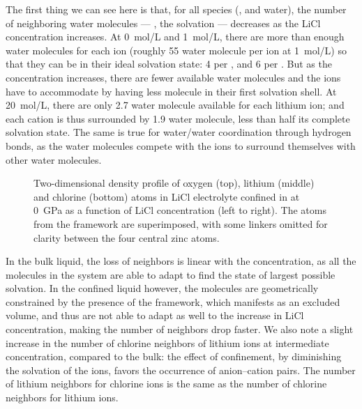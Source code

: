 \documentclass[thesis]{subfiles}
\begin{document}
The first thing we can see here is that, for all species (,  and
water), the number of neighboring water molecules --- \ie, the solvation ---
decreases as the LiCl concentration increases. At \SI{0}{mol/L} and
\SI{1}{mol/L}, there are more than enough water molecules for each ion (roughly
55 water molecule per ion at \SI{1}{mol/L}) so that they can be in their ideal
solvation state: 4  per , and 6  per . But as
the concentration increases, there are fewer available water molecules and the
ions have to accommodate by having less molecule in their first solvation shell.
At \SI{20}{mol/L}, there are only 2.7 water molecule available for each lithium
ion; and each cation is thus surrounded by 1.9 water molecule, less than half
its complete solvation state. The same is true for water/water coordination
through hydrogen bonds, as the water molecules compete with the ions to surround
themselves with other water molecules.

\begin{figure}[b]
    \centering
    
    \caption{Two-dimensional density profile of oxygen (top), lithium (middle) and
    chlorine (bottom) atoms in LiCl electrolyte confined in  at \SI{0}{GPa}
    as a function of LiCl concentration (left to right). The atoms from the
     framework are superimposed, with some linkers omitted for clarity
    between the four central zinc atoms.}
    \label{fig:licl-zif:density}
\end{figure}

In the bulk liquid, the loss of neighbors is linear with the concentration, as
all the molecules in the system are able to adapt to find the state of largest
possible solvation. In the confined liquid however, the molecules are
geometrically constrained by the presence of the  framework, which
manifests as an excluded volume, and thus are not able to adapt as well to the
increase in LiCl concentration, making the number of neighbors drop faster. We
also note a slight increase in the number of chlorine neighbors of lithium ions
at intermediate concentration, compared to the bulk: the effect of confinement,
by diminishing the solvation of the ions, favors the occurrence of anion--cation
pairs. The number of lithium neighbors for chlorine ions is the same as the
number of chlorine neighbors for lithium ions.
\end{document}
